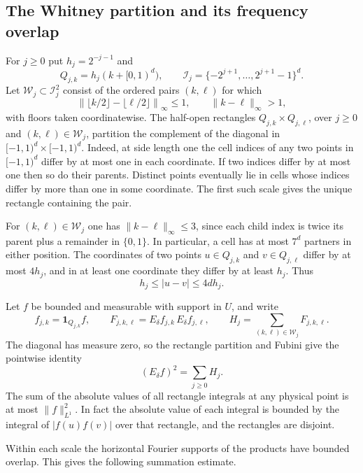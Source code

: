 \documentclass[11pt]{article}
\numberwithin{equation}{section}
\newcommand{\norm}[1]{\lVert #1\rVert}
\begin{document}
\subsection{The Whitney partition and its frequency overlap}

For \(j\ge0\) put \(h_j=2^{-j-1}\) and
\[
 Q_{j,k}=h_j(k+[0,1)^d),\qquad
 \mathcal I_j=\{-2^{j+1},\ldots,2^{j+1}-1\}^d.
\]
Let \(\mathcal W_j\subset\mathcal I_j^2\) consist of the ordered pairs
\((k,\ell)\) for which
\[
 \left\|\lfloor k/2\rfloor-\lfloor\ell/2\rfloor\right\|_\infty\le1,
 \qquad \norm{k-\ell}_\infty>1,
\]
with floors taken coordinatewise. The half-open rectangles
\(Q_{j,k}\times Q_{j,\ell}\), over \(j\ge0\) and
\((k,\ell)\in\mathcal W_j\), partition the complement of the diagonal in
\([-1,1)^d\times[-1,1)^d\). Indeed, at side length one the cell indices
of any two points in \([-1,1)^d\) differ by at most one in each
coordinate. If two indices differ by at most one then so do their
parents. Distinct points eventually lie in cells whose indices differ
by more than one in some coordinate. The first such scale gives the
unique rectangle containing the pair.

For \((k,\ell)\in\mathcal W_j\) one has
\(\norm{k-\ell}_\infty\le3\), since each child index is twice its
parent plus a remainder in \(\{0,1\}\). In particular, a cell has at
most \(7^d\) partners in either position. The coordinates of two
points \(u\in Q_{j,k}\) and \(v\in Q_{j,\ell}\) differ by at most
\(4h_j\), and in at least one coordinate they differ by at least
\(h_j\). Thus
\begin{equation}\label{kn:pair-geometry}
 h_j\le |u-v|\le4d h_j.
\end{equation}

Let \(f\) be bounded and measurable with support in \(U\), and write
\[
 f_{j,k}=\mathbf 1_{Q_{j,k}}f,
 \qquad F_{j,k,\ell}=E_\delta f_{j,k}\,E_\delta f_{j,\ell},
 \qquad H_j=\sum_{(k,\ell)\in\mathcal W_j}F_{j,k,\ell}.
\]
The diagonal has measure zero, so the rectangle partition and Fubini
give the pointwise identity
\begin{equation}\label{kn:whitney-expansion}
 (E_\delta f)^2=\sum_{j\ge0} H_j .
\end{equation}
The sum of the absolute values of all rectangle integrals at any
physical point is at most \(\norm{f}_{L^1}^2\). In fact the absolute
value of each integral is bounded by the integral of \(|f(u)f(v)|\)
over that rectangle, and the rectangles are disjoint.

Within each scale the horizontal Fourier supports of the products
have bounded overlap. This gives the following summation estimate.
\end{document}
